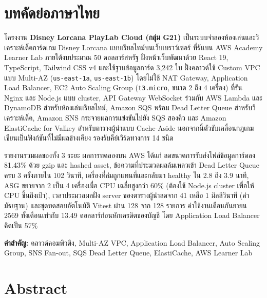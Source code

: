 \documentclass[12pt,a4paper]{report}
\begin{document}
\setcounter{page}{1}

\chapter*{บทคัดย่อภาษาไทย}

โครงงาน \textbf{Disney Lorcana PlayLab Cloud (กลุ่ม G21)} เป็นระบบจำลองห้องเล่นและวิเคราะห์เด็คการ์ดเกม Disney Lorcana แบบเรียลไทม์บนเว็บเบราว์เซอร์ ที่รันบน AWS Academy Learner Lab ภายใต้งบประมาณ 50 ดอลลาร์สหรัฐ ฝั่งหน้าเว็บพัฒนาด้วย React 19, TypeScript, Tailwind CSS v4 และใช้ฐานข้อมูลการ์ด 3,242 ใบ ฝั่งคลาวด์ใช้ Custom VPC แบบ Multi-AZ (\texttt{us-east-1a}, \texttt{us-east-1b}) โดยไม่ใช้ NAT Gateway, Application Load Balancer, EC2 Auto Scaling Group (\texttt{t3.micro}, ขนาด 2 ถึง 4 เครื่อง) ที่รัน Nginx และ Node.js แบบ cluster, API Gateway WebSocket ร่วมกับ AWS Lambda และ DynamoDB สำหรับห้องเล่นเรียลไทม์, Amazon SQS พร้อม Dead Letter Queue สำหรับวิเคราะห์เด็ค, Amazon SNS กระจายผลการแข่งขันไปยัง SQS สองคิว และ Amazon ElastiCache for Valkey สำหรับตารางผู้นำแบบ Cache-Aside นอกจากนี้ตัวขับเคลื่อนกฎเกมเขียนเป็นฟังก์ชันที่ไม่มีผลข้างเคียง รองรับคีย์เวิร์ดทางการ 14 ชนิด

รายงานรวมผลของทั้ง 3 ระยะ ผลการทดลองบน AWS ได้แก่ ลดขนาดการรับส่งไฟล์ข้อมูลการ์ดลง 81.43\% ด้วย gzip และ hashed asset, ข้อความที่ประมวลผลล้มเหลวเข้า Dead Letter Queue ครบ 3 ครั้งภายใน 102 วินาที, เครื่องที่ล่มถูกแทนที่และกลับมา healthy ใน 2.8 ถึง 3.9 นาที, ASG ขยายจาก 2 เป็น 4 เครื่องเมื่อ CPU เฉลี่ยสูงกว่า 60\% (ต้องใช้ Node.js cluster เพื่อให้ CPU ขึ้นถึงเป้า), เวลาประมวลผลฝั่ง server ของตารางผู้นำลดจาก 41 เหลือ 1 มิลลิวินาที (ค่ามัธยฐาน) และชุดทดสอบอัตโนมัติ Vitest ผ่าน 128 จาก 128 รายการ ค่าใช้งานเดือนกันยายน 2569 ทั้งเดือนเท่ากับ 13.49 ดอลลาร์ก่อนหักเครดิตของบัญชี โดย Application Load Balancer คิดเป็น 57\%

\vspace{0.6cm}
\noindent \textbf{คำสำคัญ:} คลาวด์คอมพิวติง, Multi-AZ VPC, Application Load Balancer, Auto Scaling Group, SNS Fan-out, SQS Dead Letter Queue, ElastiCache, AWS Learner Lab

\newpage

\chapter*{Abstract}
\end{document}
